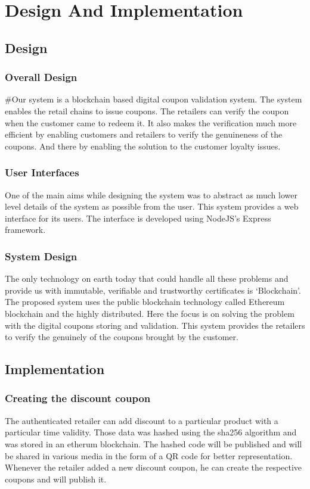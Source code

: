 \chapter{Design And Implementation}
\section{Design}
\subsection{Overall Design}
\par
#Our system is a blockchain based digital coupon validation system. The system
enables the retail chains to issue coupons. The retailers can verify the coupon
when the customer came to redeem it. It also makes the verification much more
efficient by enabling customers and retailers to verify the genuineness of the coupons. And there by enabling the solution to the customer loyalty issues.

\subsection{User Interfaces}
One of the main aims while designing the
system was to abstract as much lower level details of the system as possible
from the user. This system provides a web interface for its users. The interface is developed using NodeJS's Express framework.

\subsection{System Design}
\par
The only technology on earth today that could handle all these problems and provide us with immutable, verifiable and trustworthy certificates is ‘Blockchain’. The proposed system uses the public blockchain technology called Ethereum blockchain and the highly distributed. Here the focus is on solving the problem with the digital coupons storing and validation. This system provides the retailers to verify the genuinely of the coupons brought by the customer.
\section{Implementation}
\subsection{Creating the discount coupon}
The authenticated retailer can add discount to a particular product with a particular time validity. Those data was hashed using the sha256 algorithm and was stored in an etherum blockchain.
The hashed code will be published and will be shared in various media in the form of a QR code for better representation. Whenever the retailer added a new discount coupon, he can create the respective coupons and will publish it. 

